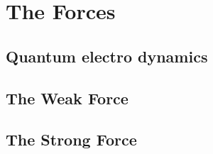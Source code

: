 \section{The Forces}
\subsection{Quantum electro dynamics}
\subsection{The Weak Force}
\subsection{The Strong Force}
